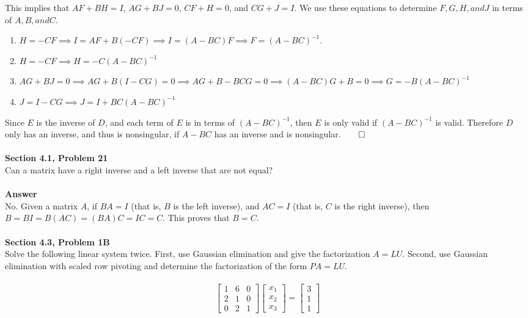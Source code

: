 \documentclass[11pt]{article}
\begin{document}
\noindent This implies that $AF + BH = I$, $AG + BJ = 0$, $CF + H = 0$, 
and $CG + J = I$. We use these equations to determine $F, G, H, and J$ in 
terms of $A, B, and C$.  
\begin{enumerate}
\item
$H = -CF \implies I = AF + B(-CF) \implies 
I = (A-BC)F \implies F = (A-BC)^{-1}$.
\item
$H = -CF \implies H = -C(A-BC)^{-1}$
\item
$AG + BJ = 0 \implies AG + B(I - CG) = 0 \implies AG + B - BCG = 0
\implies (A-BC)G + B = 0 \implies G = -B(A-BC)^{-1}$
\item
$J = I - CG \implies J = I + BC(A-BC)^{-1}$
\end{enumerate} 
Since $E$ is the inverse of $D$, and each term of $E$ is in terms of
$(A-BC)^{-1}$, then $E$ is only valid if $(A-BC)^{-1}$ is valid. Therefore
$D$ only has an inverse, and thus is nonsingular, if $A-BC$ has an 
inverse and is nonsingular.$\qed$\\
\\ 
\noindent\textbf{Section 4.1, Problem 21} \\
Can a matrix have a right inverse and a left inverse that are not equal?
\\
\\
\noindent\textbf{Answer}\\
No. Given a matrix $A$, if $BA = I$ (that is, $B$ is the left inverse), and
$AC = I$ (that is, $C$ is the right inverse), then $B = BI = B(AC) = (BA)C
= IC = C$. This proves that $B = C$.
\\
\\
\noindent\textbf{Section 4.3, Problem 1B} \\
Solve the following linear system twice. First, use Gaussian elimination and
give the factorization $A = LU$. Second, use Gaussian elimination with
scaled row pivoting and determine the factorization of the form
$PA = LU$.\\
\\
\[
\begin{bmatrix}
 1 & 6 & 0 \\
 2 & 1 & 0 \\
 0 & 2 & 1
\end{bmatrix}
\begin{bmatrix}
 x_1 \\
 x_2 \\
 x_3 
\end{bmatrix} = 
\begin{bmatrix}
 3 \\
 1 \\
 1
\end{bmatrix}
\] 
\end{document}
